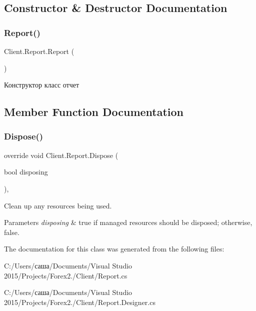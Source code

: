\subsection{Constructor \& Destructor Documentation}
\hypertarget{class_client_1_1_report_a5982d06a4b2fb26073d40133ebf9deb0}{}\label{class_client_1_1_report_a5982d06a4b2fb26073d40133ebf9deb0} 
\subsubsection{\texorpdfstring{Report()}{Report()}}
{\footnotesize\ttfamily Client.\+Report.\+Report (\begin{DoxyParamCaption}{ }\end{DoxyParamCaption})\hspace{0.3cm}{\ttfamily [inline]}}



Конструктор класс отчет 



\subsection{Member Function Documentation}
\hypertarget{class_client_1_1_report_a83e48fbf05f481d9cbb66f4700131ff6}{}\label{class_client_1_1_report_a83e48fbf05f481d9cbb66f4700131ff6} 
\subsubsection{\texorpdfstring{Dispose()}{Dispose()}}
{\footnotesize\ttfamily override void Client.\+Report.\+Dispose (\begin{DoxyParamCaption}\item[{bool}]{disposing }\end{DoxyParamCaption})\hspace{0.3cm}{\ttfamily [inline]}, {\ttfamily [protected]}}



Clean up any resources being used. 


\begin{DoxyParams}{Parameters}
{\em disposing} & true if managed resources should be disposed; otherwise, false.\\
\hline
\end{DoxyParams}


The documentation for this class was generated from the following files\+:\begin{DoxyCompactItemize}
\item 
C\+:/\+Users/саша/\+Documents/\+Visual Studio 2015/\+Projects/\+Forex2./\+Client/Report.\+cs\item 
C\+:/\+Users/саша/\+Documents/\+Visual Studio 2015/\+Projects/\+Forex2./\+Client/Report.\+Designer.\+cs\end{DoxyCompactItemize}
